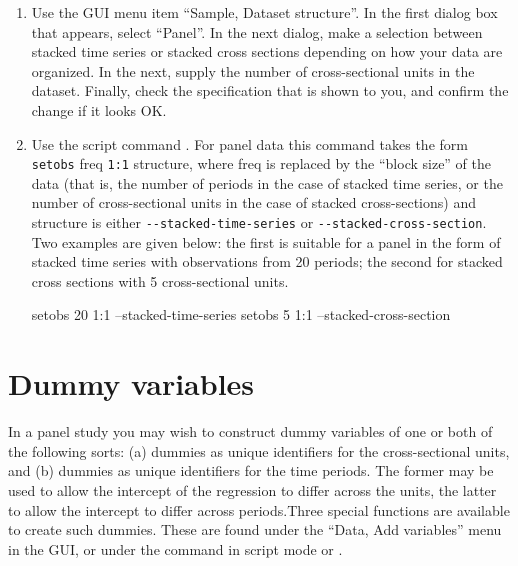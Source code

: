 \begin{enumerate}
\item Use the GUI menu item ``Sample, Dataset structure''.  In the
  first dialog box that appears, select ``Panel''.  In the next
  dialog, make a selection between stacked time series or stacked
  cross sections depending on how your data are organized.  In the
  next, supply the number of cross-sectional units in the dataset.
  Finally, check the specification that is shown to you, and confirm
  the change if it looks OK.
\item Use the script command .  For panel data this
  command takes the form \verb+setobs+ freq \verb+1:1+ structure,
  where freq is replaced by the ``block size'' of the data (that is,
  the number of periods in the case of stacked time series, or the
  number of cross-sectional units in the case of stacked
  cross-sections) and structure is either \verb+--stacked-time-series+
  or \verb+--stacked-cross-section+.  Two examples are given below:
  the first is suitable for a panel in the form of stacked time series
  with observations from 20 periods; the second for stacked cross
  sections with 5 cross-sectional units.
        
\begin{code}
            setobs 20 1:1 --stacked-time-series
            setobs 5 1:1 --stacked-cross-section
\end{code}

\end{enumerate}

\section{Dummy variables}
\label{dummies}

In a panel study you may wish to construct dummy variables of one or
both of the following sorts: (a) dummies as unique identifiers for the
cross-sectional units, and (b) dummies as unique identifiers for the
time periods.  The former may be used to allow the intercept of the
regression to differ across the units, the latter to allow the
intercept to differ across periods.Three special functions are
available to create such dummies.  These are found under the ``Data,
Add variables'' menu in the GUI, or under the  command in
script mode or .

